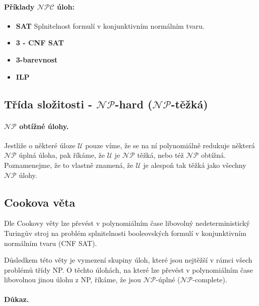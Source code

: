 \paragraph{Příklady $\mathcal{NPC}$ úloh:}
\begin{itemize}[itemsep=0pt]
    \item \textbf{\color{darkBrown}SAT} Splnitelnost formulí v konjunktivním normálním tvaru.
    
    \item \textbf{\color{darkBrown}3 - CNF SAT}
    
    \item \textbf{\color{darkBrown}3-barevnost}
    
    \item \textbf{\color{darkBrown}ILP}
\end{itemize}

\subsection*{Třída složitosti - $\mathcal{NP}$-hard ($\mathcal{NP}$-těžká)}
\label{heading:nphard}

\paragraph{$\mathcal{NP}$ obtížné úlohy.} Jestliže o některé úloze $\mathcal{U}$ pouze víme, že se na ní polynomiálně redukuje některá $\mathcal{NP}$ úplná úloha, pak říkáme, že $\mathcal{U}$ je $\mathcal{NP}$ těžká, nebo též $\mathcal{NP}$ obtížná. Poznamenejme, že to vlastně znamená, že $\mathcal{U}$ je alespoň tak těžká jako všechny $\mathcal{NP}$ úlohy.

\subsection*{Cookova věta}
Dle Cookovy věty lze převést v polynomiálním čase libovolný nedeterministický Turingův stroj na problém splnitelnosti booleovských formulí v konjunktivním normálním tvaru (CNF SAT).

Důsledkem této věty je vymezení skupiny úloh, které jsou nejtěžší v rámci všech problémů třídy NP. O těchto úlohách, na které lze převést v polynomiálním čase libovolnou jinou úlohu z NP, říkáme, že jsou $\mathcal{NP}$-úplné ($\mathcal{NP}$-complete).

\paragraph{Důkaz.}

